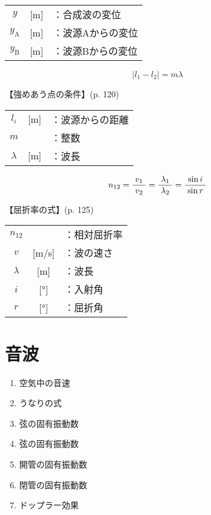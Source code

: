 \documentclass[10pt]{jarticle}
\begin{document}
\begin{tabular}{ccl}
$y$	& [m]	&：合成波の変位\\
$y_\mathrm{A}$	& [m]	&：波源Aからの変位\\
$y_\mathrm{B}$	& [m]	&：波源Bからの変位
\end{tabular}

\newpage


\[
| l_1 - l_2 |= m \lambda
\]


\vskip3mm
【強めあう点の条件】{\footnotesize (p. 120)}

\begin{tabular}{ccl}
$l_i$	& [m]	&：波源からの距離\\
$m$	& 	&：整数\\
$\lambda$	& [m]	&：波長
\end{tabular}

\newpage




\[
n_{12}	= \frac{v_1}{\; v_2 \;}
	= \frac{\lambda_1}{\; \lambda_2 \;}
	= \frac{\sin i}{\; \sin r \;} \\
\]


\vskip3mm
【屈折率の式】{\footnotesize (p. 125)}

\begin{tabular}{ccl}
$n_{12}$	&	&：相対屈折率\\
$v$	& [m/s]	&：波の速さ\\
$\lambda$	&[m]	&：波長\\
$i$	&[°]	&：入射角\\
$r$	&[°]	&：屈折角\\
\end{tabular}




\newpage
\addtocounter{page}{-1}
\thispagestyle{empty}
\section{音波}

\begin{enumerate}
\setcounter{enumi}{\thepage}
\small
\itemsep-4mm
\item 空気中の音速\\
\item うなりの式\\
\item 弦の固有振動数\\
\item 弦の固有振動数\\
\item 開管の固有振動数\\
\item 閉管の固有振動数\\
\item ドップラー効果\\
\end{enumerate}
\newpage
\end{document}
